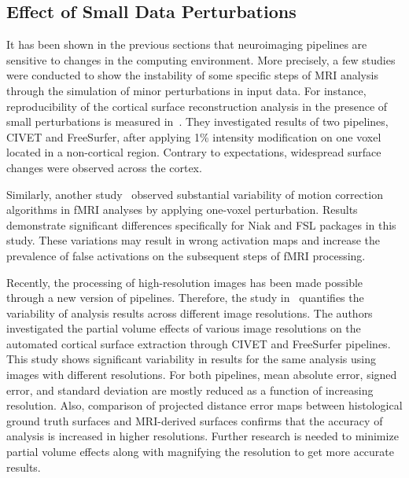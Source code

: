 \subsection{Effect of Small Data Perturbations}

It has been shown in the previous sections that neuroimaging pipelines 
are sensitive to changes in the computing environment. More precisely, 
a few studies were conducted to show the instability of some specific 
steps of MRI analysis through the simulation of minor perturbations in 
input data. For instance, reproducibility of the cortical surface 
reconstruction analysis in the presence of small perturbations is 
measured in~\cite{Lindsay2017hbm}. They investigated results of two 
pipelines, CIVET and FreeSurfer, after applying 1\% intensity 
modification on one voxel located in a non-cortical region. Contrary to 
expectations, widespread surface changes were observed across the 
cortex. 

Similarly, another study~\cite{Glatard2018hbm} observed substantial 
variability of motion correction algorithms in fMRI analyses by 
applying one-voxel perturbation. Results demonstrate significant 
differences specifically for Niak and FSL packages in this study. These 
variations may result in wrong activation maps and increase the 
prevalence of false activations on the subsequent steps of fMRI 
processing. 

Recently, the processing of high-resolution images has been made possible 
through a new version of pipelines. Therefore, the study 
in~\cite{Lindsay2018hbm} quantifies the variability of analysis results 
across different image resolutions. The authors investigated the 
partial volume effects of various image resolutions on the automated 
cortical surface extraction through CIVET and FreeSurfer pipelines. 
This study shows significant variability in results for the same 
analysis using images with different resolutions. For both pipelines, 
mean absolute error, signed error, and standard deviation are mostly 
reduced as a function of increasing resolution. Also, comparison of 
projected distance error maps between histological ground truth 
surfaces and MRI-derived surfaces confirms that the accuracy of 
analysis is increased in higher resolutions. Further research is needed 
to minimize partial volume effects along with magnifying the resolution 
to get more accurate results. 


